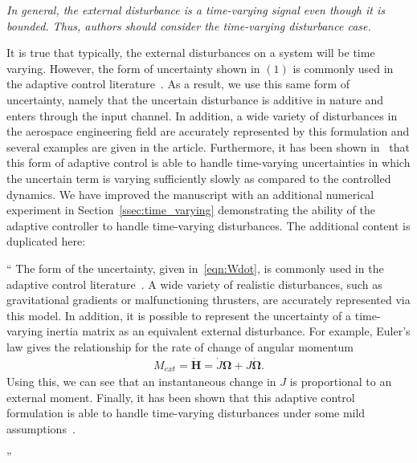 \documentclass[11pt]{article}
\newcommand{\vecbf}[1]{\bm{#1}}
\newenvironment{correction}{\begin{list}{}{\setlength{\leftmargin}{1cm}\setlength{\rightmargin}{1cm}}\vspace{\parsep}\item[]``}{''\end{list}}
\begin{document}
\begin{enumerate}

\item \textit{ In general, the external disturbance is a time-varying signal even though it is bounded. Thus, authors should consider the time-varying disturbance case.}

It is true that typically, the external disturbances on a system will be time varying.
However, the form of uncertainty shown in \( (1) \) is commonly used in the adaptive control literature~\cite{lee2013b,ioannou2012}.
As a result, we use this same form of uncertainty, namely that the uncertain disturbance is additive in nature and enters through the input channel.
In addition, a wide variety of disturbances in the aerospace engineering field are accurately represented by this formulation and several examples are given in the article.
Furthermore, it has been shown in~\cite{ioannou2012} that this form of adaptive control is able to handle time-varying uncertainties in which the uncertain term is varying sufficiently slowly as compared to the controlled dynamics. 
We have improved the manuscript with an additional numerical experiment in Section~\ref{ssec:time_varying} demonstrating the ability of the adaptive controller to handle time-varying disturbances.
The additional content is duplicated here:
\begin{correction}
    The form of the uncertainty, given in~\cref{eqn:Wdot}, is commonly used in the adaptive control literature~\cite{lee2013b,ioannou2012}. 
    A wide variety of realistic disturbances, such as gravitational gradients or malfunctioning thrusters, are accurately represented via this model. 
    In addition, it is possible to represent the uncertainty of a time-varying inertia matrix as an equivalent external disturbance. 
    For example, Euler's law gives the relationship for the rate of change of angular momentum
    \begin{align*}
        M_{ext} = \dot{\vecbf{H}} = \dot{J} \vecbf{\Omega} + J \dot{\vecbf{\Omega}} .
    \end{align*}
    Using this, we can see that an instantaneous change in \( J \) is proportional to an external moment.
    Finally, it has been shown that this adaptive control formulation is able to handle time-varying disturbances under some mild assumptions~\cite{ioannou2012}. 


\end{correction}
\end{enumerate}
\end{document}
